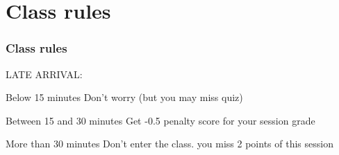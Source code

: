 \documentclass[aspectratio=169,15pt]{beamer}
\begin{document}
\section{Class rules}
\begin{frame}
    \frametitle{Class rules}

    LATE ARRIVAL:
    {
        \begin{block}{Below 15 minutes}
            Don’t worry (but you may miss quiz)
        \end{block}
    }
    {
        \begin{block}{Between 15 and 30 minutes}
            Get \alert{-0.5} penalty score for your session grade
        \end{block}
    }
    \begin{alertblock}{More than 30 minutes}
        Don’t enter the class. you miss \alert{2} points of this session
    \end{alertblock}

\end{frame}
\end{document}
